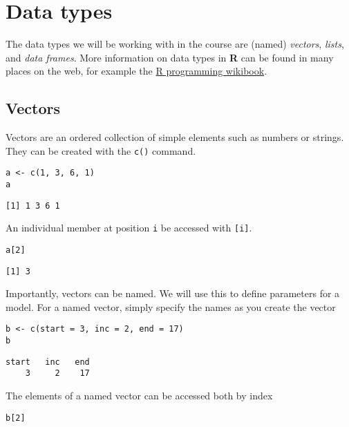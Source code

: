 \documentclass[11pt,a4paper]{article}
\begin{document}
\section{Data types}
\label{sec-2}
The data types we will be working with in the course are (named) \emph{vectors}, \emph{lists}, and \emph{data frames}. More information on data types in \textbf{R} can be found in many places on the web, for example the \href{http://en.wikibooks.org/wiki/R_Programming/Data_types}{R programming wikibook}. \\
\subsection{Vectors}
\label{sec-2-1}
Vectors are an ordered collection of simple elements such as numbers or strings. They can be created with the \verb~c()~ command. \\

\begin{verbatim}
a <- c(1, 3, 6, 1)
a
\end{verbatim}

\begin{verbatim}
[1] 1 3 6 1
\end{verbatim}

An individual member at position \verb~i~ be accessed with \verb~[i]~. \\

\begin{verbatim}
a[2]
\end{verbatim}

\begin{verbatim}
[1] 3
\end{verbatim}

Importantly, vectors can be named. We will use this to define parameters for a model. For a named vector, simply specify the names as you create the vector \\

\begin{verbatim}
b <- c(start = 3, inc = 2, end = 17)
b
\end{verbatim}

\begin{verbatim}
start   inc   end 
    3     2    17
\end{verbatim}

The elements of a named vector can be accessed both by index \\

\begin{verbatim}
b[2]
\end{verbatim}
\end{document}

